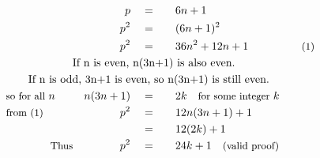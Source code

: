 \begin{alignat*}{5}
&\,&p\quad&=\quad&&6n+1\\
&\,&p^2\quad&=&&(6n+1)^2\\
&\,&p^2\quad&=&&36n^2+12n+1&&\quad\small\text{(1)}\\
&\qquad\qquad\qquad\rlap{\text{If }n\text{ is even, }n(3n+1)\text{ is also even.}}\\
&\qquad\rlap{\text{If }n\text{ is odd, }3n+1\text{ is even, so }n(3n+1)\text{ is still even.}}\\
&\small\text{so for all }n\normalsize\quad&n(3n+1)\quad&=&&2k\quad\small\text{for some integer }k\\
&\small\text{from (1)}&p^2\quad&=&&12n(3n+1)+1\\
&\,&\,&=&&12(2k)+1\\
&\qquad\qquad\small\text{Thus}&p^2\quad&=&&24k+1\quad\small\text{(valid proof)}
\end{alignat*}
